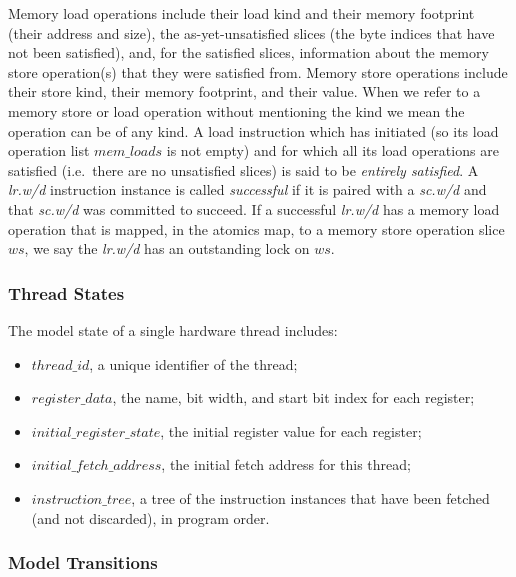 Memory load operations include their load kind and their memory footprint (their address and size), the as-yet-unsatisfied slices (the byte indices that have not been satisfied), and, for the satisfied slices, information about the memory store operation(s) that they were satisfied from.
%
Memory store operations include their store kind, their memory footprint, and their value.
When we refer to a memory store or load operation without mentioning the kind we mean the operation can be of any kind.
%
A load instruction which has initiated (so its load operation list $mem\_loads$ is not empty) and for which all its load operations are satisfied (i.e.~there are no unsatisfied slices) is said to be
\emph{entirely satisfied}.
%
A {\em lr.w/d} instruction instance is called {\em successful} if it is paired with a {\em sc.w/d} and that {\em sc.w/d} was committed to succeed.
If a successful {\em lr.w/d} has a memory load operation that is mapped, in the atomics map, to a memory store operation slice $ws$, we say the {\em lr.w/d} has an outstanding lock on $ws$.


\subsubsection{Thread States}
The model state of a single hardware thread includes:
\begin{itemize}
\item $thread\_id$, a unique identifier of the thread;
\item $register\_data$, the name, bit width, and start bit index for each register;
\item $initial\_register\_state$, the initial register value for each register;
\item $initial\_fetch\_address$, the initial fetch address for this thread;
\item $instruction\_tree$, a tree of the instruction instances that have been fetched (and not discarded), in program order.
\end{itemize}


\subsubsection{Model Transitions}\label{sec:omm:thread_trans}

